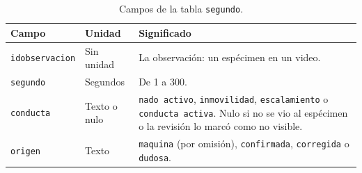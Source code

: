 \begin{table}[H]
\centering
\caption{Campos de la tabla \texttt{segundo}.}
\label{tab:ap_segundo}
\begin{tabular}{|p{3.4cm}|p{2.2cm}|p{8.2cm}|}
\hline
\textbf{Campo} & \textbf{Unidad} & \textbf{Significado} \\
\hline
\texttt{idobservacion} & Sin unidad & La observación: un espécimen en un video. \\
\hline
\texttt{segundo} & Segundos & De 1 a 300. \\
\hline
\texttt{conducta} & Texto o nulo & \texttt{nado activo}, \texttt{inmovilidad},
\texttt{escalamiento} o \texttt{conducta activa}. Nulo si no se vio al espécimen o la
revisión lo marcó como no visible. \\
\hline
\texttt{origen} & Texto & \texttt{maquina} (por omisión), \texttt{confirmada},
\texttt{corregida} o \texttt{dudosa}. \\
\hline
\end{tabular}
\end{table}
